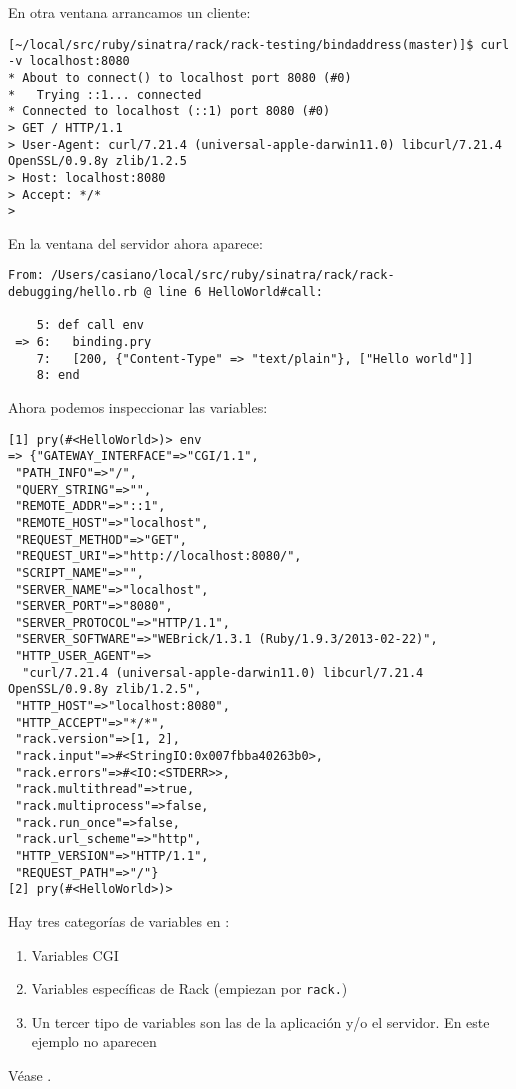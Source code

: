 En otra ventana arrancamos un cliente:
\begin{verbatim}
[~/local/src/ruby/sinatra/rack/rack-testing/bindaddress(master)]$ curl -v localhost:8080
* About to connect() to localhost port 8080 (#0)
*   Trying ::1... connected
* Connected to localhost (::1) port 8080 (#0)
> GET / HTTP/1.1
> User-Agent: curl/7.21.4 (universal-apple-darwin11.0) libcurl/7.21.4 OpenSSL/0.9.8y zlib/1.2.5
> Host: localhost:8080
> Accept: */*
> 
\end{verbatim}

En la ventana del servidor ahora aparece:
\begin{verbatim}
From: /Users/casiano/local/src/ruby/sinatra/rack/rack-debugging/hello.rb @ line 6 HelloWorld#call:

    5: def call env
 => 6:   binding.pry
    7:   [200, {"Content-Type" => "text/plain"}, ["Hello world"]]
    8: end
\end{verbatim}
Ahora podemos inspeccionar las variables:
\begin{verbatim}
[1] pry(#<HelloWorld>)> env
=> {"GATEWAY_INTERFACE"=>"CGI/1.1",
 "PATH_INFO"=>"/",
 "QUERY_STRING"=>"",
 "REMOTE_ADDR"=>"::1",
 "REMOTE_HOST"=>"localhost",
 "REQUEST_METHOD"=>"GET",
 "REQUEST_URI"=>"http://localhost:8080/",
 "SCRIPT_NAME"=>"",
 "SERVER_NAME"=>"localhost",
 "SERVER_PORT"=>"8080",
 "SERVER_PROTOCOL"=>"HTTP/1.1",
 "SERVER_SOFTWARE"=>"WEBrick/1.3.1 (Ruby/1.9.3/2013-02-22)",
 "HTTP_USER_AGENT"=>
  "curl/7.21.4 (universal-apple-darwin11.0) libcurl/7.21.4 OpenSSL/0.9.8y zlib/1.2.5",
 "HTTP_HOST"=>"localhost:8080",
 "HTTP_ACCEPT"=>"*/*",
 "rack.version"=>[1, 2],
 "rack.input"=>#<StringIO:0x007fbba40263b0>,
 "rack.errors"=>#<IO:<STDERR>>,
 "rack.multithread"=>true,
 "rack.multiprocess"=>false,
 "rack.run_once"=>false,
 "rack.url_scheme"=>"http",
 "HTTP_VERSION"=>"HTTP/1.1",
 "REQUEST_PATH"=>"/"}
[2] pry(#<HelloWorld>)>
\end{verbatim}
Hay tres categorías de variables en :

\begin{enumerate}
\item 
Variables CGI
\item 
Variables específicas de Rack (empiezan por \verb|rack.|)
\item 
Un tercer tipo de variables son las de la aplicación y/o el servidor.
En este ejemplo no aparecen
\end{enumerate}
Véase .


